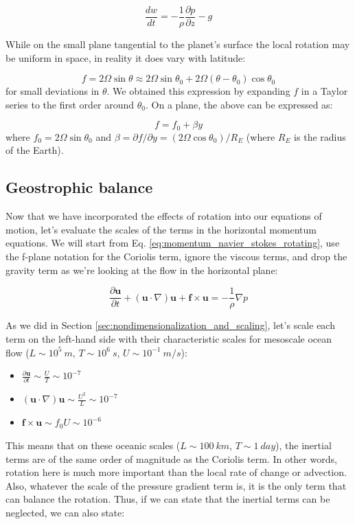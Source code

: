 \documentclass[12pt]{article}
\numberwithin{equation}{section}
\numberwithin{figure}{section}
\numberwithin{table}{section}
\begin{document}
\begin{equation}
  \frac{dw}{dt} = - \frac{1}{\rho} \frac{\partial p}{\partial z} - g
\end{equation}

While on the small plane tangential to the planet's surface the local rotation
may be uniform in space, in reality it does vary with latitude:

\begin{equation}
  f = 2 \Omega \sin\theta \approx 2\Omega \sin\theta_0 + 2\Omega (\theta - \theta_0) \cos\theta_0
\end{equation}
for small deviations in $\theta$.
We obtained this expression by expanding $f$ in a Taylor series to the first
order around $\theta_0$.
On a plane, the above can be expressed as:

\begin{equation}
f = f_0 + \beta y
\end{equation}
where $f_0 = 2\Omega \sin\theta_0$ and $\beta = \partial f/\partial y = (2\Omega\cos\theta_0) / R_E$
(where $R_E$ is the radius of the Earth).

\subsection{Geostrophic balance}
\label{sec:geostrophic_balance}

Now that we have incorporated the effects of rotation into our equations of motion,
let's evaluate the scales of the terms in the horizontal momentum equations.
We will start from Eq. \ref{eq:momentum_navier_stokes_rotating}, use the f-plane
notation for the Coriolis term, ignore the viscous terms, and drop the gravity
term as we're looking at the flow in the horizontal plane:

\begin{equation}
  \frac{\partial \mathbf{u}}{\partial t} +
  (\mathbf{u} \cdot \nabla) \mathbf{u} +
  \mathbf{f} \times \mathbf{u} =
  - \frac{1}{\rho} \nabla p
\end{equation}

As we did in Section \ref{sec:nondimensionalization_and_scaling}, let's scale
each term on the left-hand side with their characteristic scales for mesoscale
ocean flow ($L \sim 10^5\ m$, $T \sim 10^6\ s$, $U \sim 10^{-1}\ m/s$):

\begin{itemize}
  \item $\frac{\partial \mathbf{u}}{\partial t} \sim \frac{U}{T} \sim 10^{-7}$
  \item $(\mathbf{u} \cdot \nabla) \mathbf{u} \sim \frac{U^2}{L} \sim 10^{-7}$
  \item $\mathbf{f} \times \mathbf{u} \sim f_0 U \sim 10^{-6}$
\end{itemize}
This means that on these oceanic scales ($L \sim 100\ km$, $T \sim 1\ day$),
the inertial terms are of the same order of magnitude as the Coriolis term.
In other words, rotation here is much more important than the local rate of
change or advection.
Also, whatever the scale of the pressure gradient term is, it is the only
term that can balance the rotation.
Thus, if we can state that the inertial terms can be neglected, we can also
state:
\end{document}
